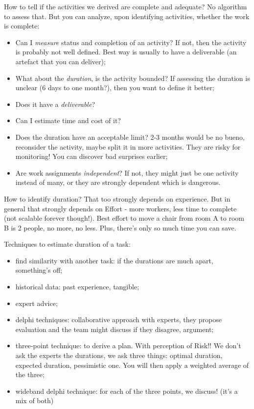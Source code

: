 \noindent How to tell if the activities we derived are complete and adequate? No algorithm to assess that. But you can analyze, upon identifying activities, whether the work is complete:
\begin{itemize}
	\item Can I \textit{measure} status and completion of an activity? If not, then the activity is probably not well defined. Best way is usually to have a deliverable (an artefact that you can deliver);
	\item What about the \textit{duration}, is the activity bounded? If assessing the duration is unclear (6 days to one month?), then you want to define it better;
	\item Does it have a \textit{deliverable}?
	\item Can I estimate time and cost of it? 
	\item Does the duration have an acceptable limit? 2-3 months would be no bueno, reconsider the activity, maybe split it in more activities. They are risky for monitoring! You can discover bad surprises earlier;
	\item Are work assignments \textit{independent}? If not, they might just be one activity instead of many, or they are strongly dependent which is dangerous.
\end{itemize}

\noindent How to identify duration? That too strongly depends on experience. But in general that strongly depends on Effort - more workers, less time to complete (not scalable forever though!). Best effort to move a chair from room A to room B is 2 people, no more, no less. Plus, there's only so much time you can save.

\noindent Techniques to estimate duration of a task:
\begin{itemize}
	\item find similarity with another task: if the durations are much apart, something's off;
	\item historical data: past experience, tangible;
	\item expert advice;
	\item delphi techniques: collaborative approach with experts, they propose evaluation and the team might discuss if they disagree, argument;
	\item three-point technique: to derive a plan. With perception of Risk!! We don't ask the experts the durations, we ask three things: optimal duration, expected duration, pessimistic one. You will then apply a weighted average of the three;
	\item wideband delphi technique: for each of the three points, we discuss! (it's a mix of both)
\end{itemize}


